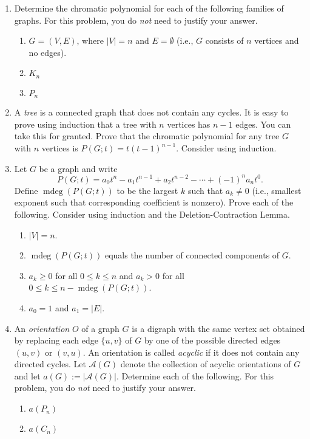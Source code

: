 \documentclass[11pt]{article}%
\theoremstyle{definition}
\DeclareMathOperator{\mdeg}{mdeg}
\DeclareRobustCommand{\rchi}{{\mathpalette\irchi\relax}}
\newcommand{\irchi}[2]{\raisebox{\depth}{$#1\chi$}}
\begin{document}
\begin{enumerate}

\item Determine the chromatic polynomial for each of the following families of graphs. For this problem, you do \emph{not} need to justify your answer.
\begin{enumerate}
\item $G=(V,E)$, where $|V|=n$ and $E=\emptyset$ (i.e., $G$ consists of $n$ vertices and no edges).
\item $K_n$
\item $P_n$
\end{enumerate}

\item A \emph{tree} is a connected graph that does not contain any cycles. It is easy to prove using induction that a tree with $n$ vertices has $n-1$ edges. You can take this for granted. Prove that the chromatic polynomial for any tree $G$ with $n$ vertices is $P(G;t)=t(t-1)^{n-1}$. Consider using induction.

\item Let $G$ be a graph and write
\[
P(G;t)=a_0t^n-a_1t^{n-1}+a_2t^{n-2}-\cdots +(-1)^na_nt^0.
\]
Define $\mdeg(P(G;t))$ to be the largest $k$ such that $a_k\neq 0$ (i.e., smallest exponent such that corresponding coefficient is nonzero). Prove each of the following. Consider using induction and the Deletion-Contraction Lemma.
\begin{enumerate}
\item $|V|=n$.
\item $\mdeg(P(G;t))$ equals the number of connected components of $G$.
\item $a_k\geq 0$ for all $0\leq k\leq n$ and $a_k>0$ for all $0\leq k\leq n-\mdeg(P(G;t))$.
\item $a_0=1$ and $a_1=|E|$.
\end{enumerate}

\item An \emph{orientation} $O$ of a graph $G$ is a digraph with the same vertex set obtained by replacing each edge $\{u,v\}$ of $G$ by one of the possible directed edges $(u,v)$ or $(v,u)$.  An orientation is called \emph{acyclic} if it does not contain any directed cycles.  Let $\mathcal{A}(G)$ denote the collection of acyclic orientations of $G$ and let $a(G):=|\mathcal{A}(G)|$. 
Determine each of the following. For this problem, you do \emph{not} need to justify your answer.
\begin{enumerate}
\item $a(P_n)$
\item $a(C_n)$
\end{enumerate}


\end{enumerate}
\end{document}
